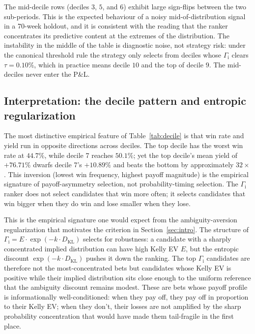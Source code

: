 \documentclass[11pt]{article}
\theoremstyle{definition}
\theoremstyle{remark}
\newcommand{\KL}{D_{\mathrm{KL}}}
\newcommand{\GROUND}{\Gamma_{\mathrm{i}}}
\begin{document}
The mid-decile rows (deciles $3$, $5$, and $6$) exhibit large
sign-flips between the two sub-periods. This is the expected
behaviour of a noisy mid-of-distribution signal in a 70-week
holdout, and it is consistent with the reading that the ranker
concentrates its predictive content at the extremes of the
distribution. The instability in the middle of the table is
diagnostic noise, not strategy risk: under the canonical
threshold rule the strategy only selects from deciles whose
$\GROUND$ clears $\tau = 0.10\%$, which in practice means decile
$10$ and the top of decile $9$. The mid-deciles never enter the
P\&L.

\subsection{Interpretation: the decile pattern and entropic regularization}

The most distinctive empirical feature of
Table~\ref{tab:decile} is that win rate and yield run in opposite directions across deciles. The top decile has the worst win rate at $44.7\%$, while decile 7 reaches $50.1\%$; yet the top decile's mean yield of
$+76.71\%$ dwarfs decile 7's $+10.89\%$ and beats the bottom by
approximately $32\times$. This inversion (lowest win frequency, highest payoff magnitude) is the empirical signature of
payoff-asymmetry selection, not probability-timing selection. The
$\GROUND$ ranker does not select candidates that win more often; it
selects candidates that win bigger when they do win and lose
smaller when they lose.

This is the empirical signature one would expect from the
ambiguity-aversion regularization that motivates the criterion in
Section~\ref{sec:intro}. The structure of $\GROUND = E \cdot
\exp(-k \cdot \KL)$ selects for robustness: a candidate with a sharply concentrated
implied distribution can have high Kelly EV $E$, but the entropic
discount $\exp(-k \cdot \KL)$ pushes it down the ranking. The top
$\GROUND$ candidates are therefore not the most-concentrated bets
but candidates whose Kelly EV is positive while their implied
distribution sits close enough to the uniform reference that the
ambiguity discount remains modest. These are bets whose payoff
profile is informationally well-conditioned: when they pay off,
they pay off in proportion to their Kelly EV; when they don't,
their losses are not amplified by the sharp probability
concentration that would have made them tail-fragile in the first
place.
\end{document}
